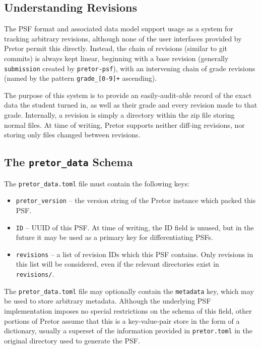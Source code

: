 \documentclass{book}
\begin{document}
\subsection{Understanding Revisions} \label{sec:understanding_revisions}

The PSF format and associated data model support usage as a system for tracking
arbitrary revisions, although none of the user interfaces provided by Pretor
permit this directly. Instead, the chain of revisions (similar to git commits)
is always kept linear, beginning with a base revision (generally
\texttt{submission} created by \texttt{pretor-psf}), with an intervening chain
of grade revisions (named by the pattern \texttt{grade\_[0-9]+} ascending).

The purpose of this system is to provide an easily-audit-able record of the
exact data the student turned in, as well as their grade and every revision
made to that grade. Internally, a revision is simply a directory within the zip
file storing normal files. At time of writing, Pretor supports neither diff-ing
revisions, nor storing only files changed between revisions.

\subsection{The \texttt{pretor\_data} Schema} \label{sec:pretor_data_schema}

The \texttt{pretor\_data.toml} file must contain the following keys:

\begin{itemize}

	\item \texttt{pretor\_version} -- the version string of the Pretor
		instance which packed this PSF.

	\item \texttt{ID} -- UUID of this PSF. At time of writing, the ID field
		is unused, but in the future it may be used as a primary key
		for differentiating PSFs.

	\item \texttt{revisions} -- a list of revision IDs which this PSF
		contains. Only revisions in this list will be considered, even
		if the relevant directories exist in \texttt{revisions/}.

\end{itemize}

The \texttt{pretor\_data.toml} file may optionally contain the
\texttt{metadata} key, which may be used to store arbitrary metadata. Although
the underlying PSF implementation imposes no special restrictions on the schema
of this field, other portions of Pretor assume that this is a key-value-pair
store in the form of a dictionary, usually a superset of the information
provided in \texttt{pretor.toml} in the original directory used to generate the
PSF.
\end{document}
